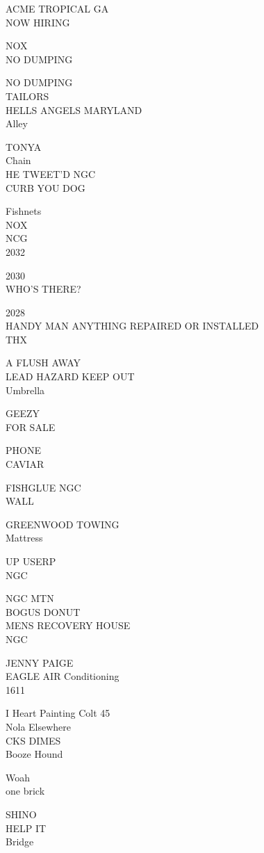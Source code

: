 \documentclass[10pt,letterpaper]{article}
\begin{document}
ACME TROPICAL GA\\
NOW HIRING

NOX\\
NO DUMPING

NO DUMPING\\
TAILORS\\
HELLS ANGELS MARYLAND\\
Alley

TONYA\\
Chain\\
HE TWEET'D NGC\\
CURB YOU DOG

Fishnets\\
NOX\\
NCG\\
2032

2030\\
WHO'S THERE?

2028\\
HANDY MAN ANYTHING REPAIRED OR INSTALLED\\
THX

A FLUSH AWAY\\
LEAD HAZARD KEEP OUT\\
Umbrella

GEEZY\\
FOR SALE

PHONE\\
CAVIAR

FISHGLUE NGC\\
WALL

GREENWOOD TOWING\\
Mattress

UP USERP\\
NGC

NGC MTN\\
BOGUS DONUT\\
MENS RECOVERY HOUSE\\
NGC

JENNY PAIGE\\
EAGLE AIR Conditioning\\
1611

I Heart Painting Colt 45\\
Nola Elsewhere\\
CKS DIMES\\
Booze Hound

Woah\\
one brick

SHINO\\
HELP IT\\
Bridge
\end{document}

